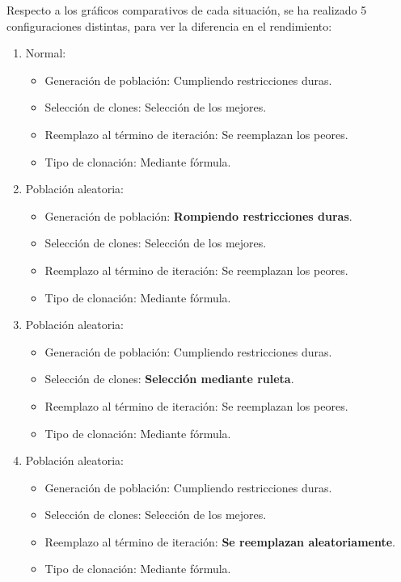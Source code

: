 Respecto a los gráficos comparativos de cada situación,
se ha realizado 5 configuraciones distintas, para ver la diferencia en el rendimiento:
\begin{enumerate}
	\item Normal:

		\begin{itemize}
			\item Generación de población: Cumpliendo restricciones duras.
			\item Selección de clones: Selección de los mejores.
			\item Reemplazo al término de iteración:  Se reemplazan los peores.
			\item Tipo de clonación: Mediante fórmula.
		\end{itemize}
	\item Población aleatoria:

		\begin{itemize}
			\item Generación de población: \textbf{Rompiendo restricciones duras}.
			\item Selección de clones: Selección de los mejores.
			\item Reemplazo al término de iteración:  Se reemplazan los peores.
			\item Tipo de clonación: Mediante fórmula.
		\end{itemize}

	\item Población aleatoria:

		\begin{itemize}
			\item Generación de población: Cumpliendo restricciones duras.
			\item Selección de clones: \textbf{Selección mediante ruleta}.
			\item Reemplazo al término de iteración:  Se reemplazan los peores.
			\item Tipo de clonación: Mediante fórmula.
		\end{itemize}

	\item Población aleatoria:

		\begin{itemize}
			\item Generación de población: Cumpliendo restricciones duras.
			\item Selección de clones: Selección de los mejores.
			\item Reemplazo al término de iteración:  \textbf{Se reemplazan aleatoriamente}.
			\item Tipo de clonación: Mediante fórmula.
		\end{itemize}


\end{enumerate}
